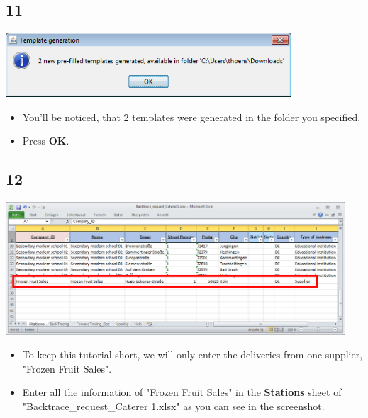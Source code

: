 \documentclass{beamer}
\begin{document}
\subsection{11}
\begin{frame}
	\begin{center}
  		\includegraphics[width=0.8\textwidth]{11.png}
	\end{center}
	\begin{itemize}
		\item You'll be noticed, that 2 templates were generated in the folder you specified.
		\item Press \textbf{OK}.
	\end{itemize}
\end{frame}

\subsection{12}
\begin{frame}
	\begin{center}
  		\includegraphics[width=0.95\textwidth]{12.png}
	\end{center}
	\begin{itemize}
		\item To keep this tutorial short, we will only enter the deliveries from one supplier, "Frozen Fruit Sales".
		\item Enter all the information of "Frozen Fruit Sales" in the \textbf{Stations} sheet of "Backtrace\_request\_Caterer 1.xlsx" as you can see in the screenshot.
	\end{itemize}
\end{frame}
\end{document}
